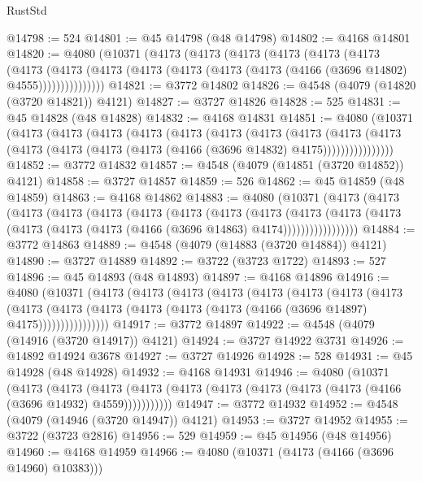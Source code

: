 \begin{lexlean}{RustStd}
\begin{coremodule}
@14798 := 524
@14801 := @45 @14798 (@48 @14798)
@14802 := @4168 @14801
@14820 := @4080
    (@10371
      (@4173
        (@4173
          (@4173
            (@4173
              (@4173
                (@4173
                  (@4173
                    (@4173
                      (@4173 (@4173 (@4173 (@4173 (@4173 (@4166 (@3696 @14802) @4555)))))))))))))))
@14821 := @3772 @14802
@14826 := @4548 (@4079 (@14820 (@3720 @14821)) @4121)
@14827 := @3727 @14826
@14828 := 525
@14831 := @45 @14828 (@48 @14828)
@14832 := @4168 @14831
@14851 := @4080
    (@10371
      (@4173
        (@4173
          (@4173
            (@4173
              (@4173
                (@4173
                  (@4173
                    (@4173
                      (@4173
                        (@4173
                          (@4173 (@4173 (@4173 (@4173 (@4166 (@3696 @14832) @4175))))))))))))))))
@14852 := @3772 @14832
@14857 := @4548 (@4079 (@14851 (@3720 @14852)) @4121)
@14858 := @3727 @14857
@14859 := 526
@14862 := @45 @14859 (@48 @14859)
@14863 := @4168 @14862
@14883 := @4080
    (@10371
      (@4173
        (@4173
          (@4173
            (@4173
              (@4173
                (@4173
                  (@4173
                    (@4173
                      (@4173
                        (@4173
                          (@4173
                            (@4173 (@4173 (@4173 (@4173 (@4166 (@3696 @14863) @4174)))))))))))))))))
@14884 := @3772 @14863
@14889 := @4548 (@4079 (@14883 (@3720 @14884)) @4121)
@14890 := @3727 @14889
@14892 := @3722 (@3723 @1722)
@14893 := 527
@14896 := @45 @14893 (@48 @14893)
@14897 := @4168 @14896
@14916 := @4080
    (@10371
      (@4173
        (@4173
          (@4173
            (@4173
              (@4173
                (@4173
                  (@4173
                    (@4173
                      (@4173
                        (@4173
                          (@4173 (@4173 (@4173 (@4173 (@4166 (@3696 @14897) @4175))))))))))))))))
@14917 := @3772 @14897
@14922 := @4548 (@4079 (@14916 (@3720 @14917)) @4121)
@14924 := @3727 @14922 @3731
@14926 := @14892 @14924 @3678
@14927 := @3727 @14926
@14928 := 528
@14931 := @45 @14928 (@48 @14928)
@14932 := @4168 @14931
@14946 := @4080
    (@10371
      (@4173
        (@4173
          (@4173 (@4173 (@4173 (@4173 (@4173 (@4173 (@4173 (@4166 (@3696 @14932) @4559)))))))))))
@14947 := @3772 @14932
@14952 := @4548 (@4079 (@14946 (@3720 @14947)) @4121)
@14953 := @3727 @14952
@14955 := @3722 (@3723 @2816)
@14956 := 529
@14959 := @45 @14956 (@48 @14956)
@14960 := @4168 @14959
@14966 := @4080 (@10371 (@4173 (@4166 (@3696 @14960) @10383)))

\end{coremodule}
\end{lexlean}
